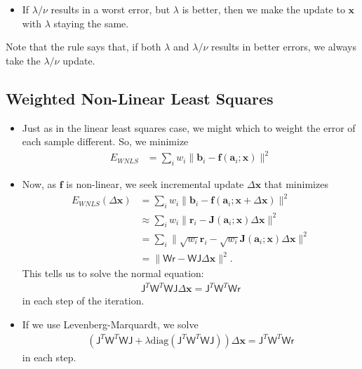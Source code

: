 \documentclass[10pt]{article}
\newcommand{\ve}[1]{\mathbf{#1}}
\newcommand{\msf}[1]{\mathsf{#1}}
\newcommand{\mrm}[1]{\mathrm{#1}}
\begin{document}
\begin{itemize}
\begin{itemize}
\begin{itemize}
            \item If $\lambda / \nu$ results in a worst error,
              but $\lambda$ is better, then we make the update
              to $\ve{x}$ with $\lambda$ staying the same.
          \end{itemize}
      \end{itemize}
      Note that the rule says that, if both $\lambda$ and $\lambda/\nu$
      results in better errors, we always take the $\lambda/\nu$
      update.
  \end{itemize}
  
  \subsection{Weighted Non-Linear Least Squares}
  
  \begin{itemize}
    \item Just as in the linear least squares case, 
      we might which to weight the error of each sample
      different. So, we minimize
      \begin{align*}
        E_{WNLS} 
        &= \sum_i w_i \| \ve{b}_i - 
          \ve{f}(\ve{a}_i;\ve{x}) \|^2        
      \end{align*}
    
    \item Now, as $\ve{f}$ is non-linear, we seek incremental 
      update $\Delta \ve{x}$ that minimizes
      \begin{align*}
        E_{WNLS}(\Delta \ve{x}) 
        &= \sum_i w_i \| \ve{b}_i - 
          \ve{f}(\ve{a}_i;\ve{x} + \Delta \ve{x}) \|^2\\
        &\approx \sum_i w_i \| \ve{r}_i - \ve{J}(\ve{a}_i;\ve{x})\Delta \ve{x} \|^2\\
        &= \sum_i \| \sqrt{w_i} \ve{r}_i - \sqrt{w_i} \ve{J}(\ve{a}_i;\ve{x})\Delta \ve{x} \|^2\\
        &= \| \msf{W} \msf{r} - \msf{W} \msf{J} \Delta \ve{x} \|^2.
      \end{align*}
      This tells us to solve the normal equation:
      \begin{align*}
        \msf{J}^T \msf{W}^T \msf{W} \msf{J} \Delta \ve{x}
        = \msf{J}^T \msf{W}^T \msf{W} \msf{r}
      \end{align*}
      in each step of the iteration.
      
    \item If we use Levenberg-Marquardt, we solve
      \begin{align*}
        (\msf{J}^T \msf{W}^T \msf{W} \msf{J}  + \lambda \mrm{diag}(\msf{J}^T \msf{W}^T \msf{W} \msf{J})) \Delta \ve{x}
        = \msf{J}^T \msf{W}^T \msf{W} \msf{r}
      \end{align*}
      in each step.
  \end{itemize}
  
\end{document}
